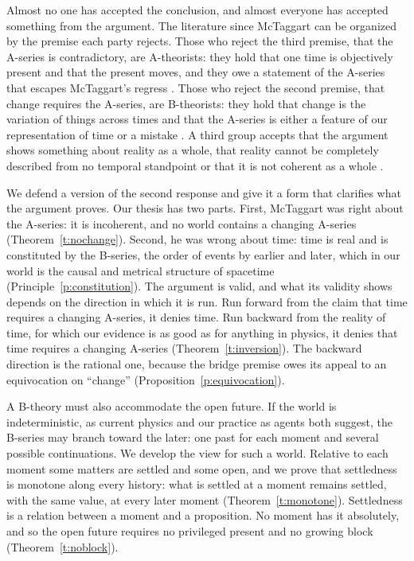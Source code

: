 \documentclass{situationist-preprint}
\begin{document}
Almost no one has accepted the conclusion, and almost everyone has accepted something from the argument. The literature since McTaggart can be organized by the premise each party rejects. Those who reject the third premise, that the A-series is contradictory, are A-theorists: they hold that one time is objectively present and that the present moves, and they owe a statement of the A-series that escapes McTaggart's regress \citep{Broad1938,Prior1967,Zimmerman2005,Cameron2015}. Those who reject the second premise, that change requires the A-series, are B-theorists: they hold that change is the variation of things across times and that the A-series is either a feature of our representation of time or a mistake \citep{Russell1903,Russell1915,Smart1963,Mellor1981,Mellor1998}. A third group accepts that the argument shows something about reality as a whole, that reality cannot be completely described from no temporal standpoint \citep{Dummett1960} or that it is not coherent as a whole \citep{Fine2005}.

We defend a version of the second response and give it a form that clarifies what the argument proves. Our thesis has two parts. First, McTaggart was right about the A-series: it is incoherent, and no world contains a changing A-series (Theorem~\ref{t:nochange}). Second, he was wrong about time: time is real and is constituted by the B-series, the order of events by earlier and later, which in our world is the causal and metrical structure of spacetime (Principle~\ref{p:constitution}). The argument is valid, and what its validity shows depends on the direction in which it is run. Run forward from the claim that time requires a changing A-series, it denies time. Run backward from the reality of time, for which our evidence is as good as for anything in physics, it denies that time requires a changing A-series (Theorem~\ref{t:inversion}). The backward direction is the rational one, because the bridge premise owes its appeal to an equivocation on \enquote{change} (Proposition~\ref{p:equivocation}).

A B-theory must also accommodate the open future. If the world is indeterministic, as current physics and our practice as agents both suggest, the B-series may branch toward the later: one past for each moment and several possible continuations. We develop the view for such a world. Relative to each moment some matters are settled and some open, and we prove that settledness is monotone along every history: what is settled at a moment remains settled, with the same value, at every later moment (Theorem~\ref{t:monotone}). Settledness is a relation between a moment and a proposition. No moment has it absolutely, and so the open future requires no privileged present and no growing block (Theorem~\ref{t:noblock}).
\end{document}
